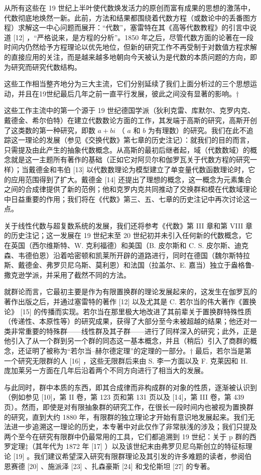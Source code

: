 从所有这些在 19 世纪上半叶使代数焕发活力的原创而富有成果的思想的激荡中，代数彻底地焕然一新。此前，方法和结果都围绕着代数方程（或数论中的丢番图方程）求解这一中心问题而展开：“代数”，塞雷特在其《高等代数教程》的引言中说道 {[}12{]} ，“严格说来，是方程的分析”。1850 年之后，尽管代数方面的论著在一段时间内仍然给予方程理论以优先地位，但新的研究工作不再受制于对数值方程求解的直接应用的关注，而是越来越多地朝向今天被认为是代数的本质问题的方向，即为研究而研究代数结构。

这些工作相当整齐地分为三大主流，它们分别延续了我们上面分析过的三个思想运动，并且在19世纪最后几年之前一直平行发展，彼此之间没有显著的影响。†

这些工作主流中的第一个源于 19 世纪德国学派（狄利克雷、库默尔、克罗内克、戴德金、希尔伯特）在建立代数数论方面的工作，其发端于高斯的研究，高斯开创了这类数的第一种研究，即数 \(a + bi\) （ \(a\) 和 \(b\) 为有理数）的研究。我们在此不追踪这一理论的发展（参见《交换代数》第七章的历史注记）：就我们的目的而言，只需提及由此产生的抽象代数概念。从高斯的最初后继者起，域（代数数域）的概念就是这一主题所有著作的基础（正如它对阿贝尔和伽罗瓦关于代数方程的研究一样）；当戴德金和韦伯 {[}13{]} 以代数数理论为模型建立了单变量代数函数理论时，它的应用范围得到了扩大。戴德金 {[}14{]} 还提出了理想的概念，这一概念为元素集合之间的合成律提供了新的范例；他和克罗内克共同推动了交换群和模在代数域理论中日益重要的作用；我们将在《代数》第三、五、七章的历史注记中再次讨论这一点。

关于线性代数与超复数系统的发展，我们还将参考《代数》第 III 章和第 VIII 章的历史注记；这一发展在 19 世纪末至 20 世纪初并未引入任何新的代数概念，它在英国（西尔维斯特、W. 克利福德）和美国（B. 皮尔斯和 C. S. 皮尔斯、迪克森、韦德伯恩）沿着哈密顿和凯莱所开辟的道路进行，同时在德国（魏尔斯特拉斯、戴德金、弗罗贝尼乌斯、莫利恩）和法国（拉盖尔、E. 嘉当）独立于盎格鲁-撒克逊学派，并采用了截然不同的方法。

就群论而言，它最初主要是作为有限置换群的理论发展起来的，这发生在伽罗瓦的著作出版之后，并通过塞雷特的著作 {[}12{]} 以及尤其是 C. 若尔当的伟大著作《置换论》 {[}15{]} 的传播而实现。若尔当在那里极大地改进了其前辈关于置换群特殊性质（传递性、本原性等）的研究成果，获得了大部分至今未被超越的结果；他还对一类非常重要的特殊群——线性群及其子群——进行了同样深入的研究；此外，正是他引入了从一个群到另一个群的同态这一基本概念，并且（稍后）引入了商群的概念，还证明了被称为“若尔当–赫尔德定理”的定理的一部分。† 最后，若尔当是第一个研究无限群的人 {[}16{]} ，这些无限群后来由 S. 李一方面以及 F. 克莱因和 H. 庞加莱另一方面在几年后沿着两个不同方向进行了相当大的发展。

与此同时，群中本质的东西，即其合成律而非构成群的对象的性质，逐渐被认识到（例如参见 {[}10{]}，第 II 卷，第 123 页和第 131 页以及 {[}14{]}，第 III 卷，第 439 页）。然而，即使是对有限抽象群的研究工作，在很长一段时间内也被视为置换群的研究，直到大约 1880 年，有限群的独立理论才开始有意识地发展起来。我们无法进一步追溯这一理论的历史，本专著中对此仅作了非常肤浅的涉及；我们只提及两个至今在研究有限群中仍最常用的工具，它们都追溯到 19 世纪：关于 p 群的西罗定理‡（其年代为 1872 年 {[}17{]} ）以及该世纪末由弗罗贝尼乌斯创立的特征标理论 {[}19{]} 。我们建议希望深入研究有限群理论及其引发的许多难题的读者，参阅伯恩赛德 {[}20{]} 、施派泽 {[}23{]} 、扎森豪斯 {[}24{]} 和戈伦斯坦 {[}27{]} 的专著。

